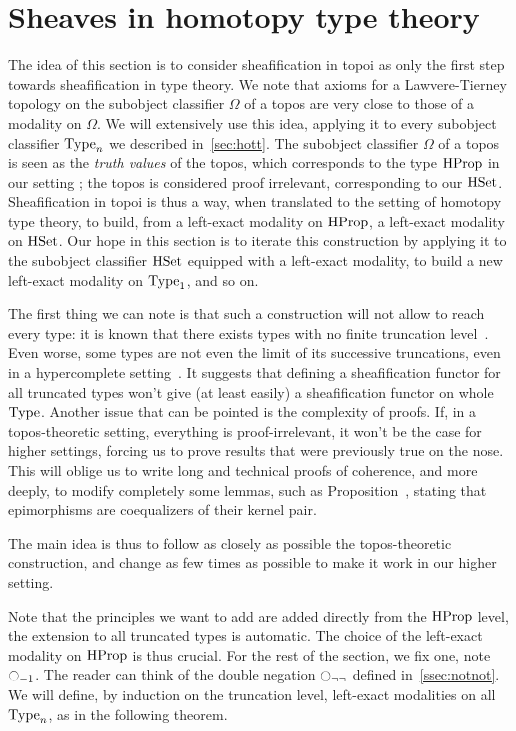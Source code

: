 \section{Sheaves in homotopy type theory}
\label{sec:sheaf_hott}

The idea of this section is to consider sheafification in topoi as
only the first step towards sheafification in type theory. 
We note that axioms for a Lawvere-Tierney topology on the subobject
classifier $\Omega$ of a topos are very close to
those of a modality on $\Omega$. We will extensively use this idea,
applying it to every subobject classifier $\operatorname{Type}_n$ we described
in~\ref{sec:hott}. The subobject
classifier $\Omega$ of a topos is seen as the {\em truth values} of the
topos, which corresponds to the type $\operatorname{HProp}$ in our setting ; the
topos is considered proof irrelevant, corresponding to our
$\operatorname{HSet}$. Sheafification in topoi is thus a way, when translated to the
setting of homotopy type theory, to build, from a left-exact modality on
$\operatorname{HProp}$, a left-exact modality on $\operatorname{HSet}$. Our hope in this section
is to iterate this construction by applying it to the subobject
classifier $\operatorname{HSet}$ equipped with a left-exact modality, to build a new
left-exact modality on $\operatorname{Type}_1$, and so on. 

The first thing we can
note is that such a construction will not allow to reach every type:
it is known that there exists types with no finite truncation
level~\cite[Example 8.8.6]{hottbook}. Even worse, some types are not
even the limit of its successive truncations, even in a hypercomplete
setting~\cite{morelvv}. It suggests that defining a sheafification
functor for all truncated types won't give (at least easily) a
sheafification functor on whole $\operatorname{Type}$.
Another issue that can be pointed is the complexity of proofs. If, in
a topos-theoretic setting, everything is proof-irrelevant, it won't be
the case for higher settings, forcing us to prove results that were
previously true on the nose. This will oblige us to write long and
technical proofs of coherence, and more deeply, to modify completely
some lemmas, such as Proposition~\cite[IV.7.8]{maclanemoerdijk},
stating that epimorphisms are coequalizers of their kernel pair.

The main idea is thus to follow as closely as possible the
topos-theoretic construction, and change as few times as possible to
make it work in our higher setting.

Note that the principles we want to add are added directly from the
$\operatorname{HProp}$ level, the extension to all truncated types is automatic. The
choice of the left-exact modality on $\operatorname{HProp}$ is thus crucial. For the
rest of the section, we fix one, note $\ocircle_{-1}$. The reader can
think of the double negation $\ocircle_{\lnot\lnot}$ defined
in~\ref{ssec:notnot}. We will define, by induction on the truncation
level, left-exact modalities on all $\operatorname{Type}_n$, as in the following
theorem.

